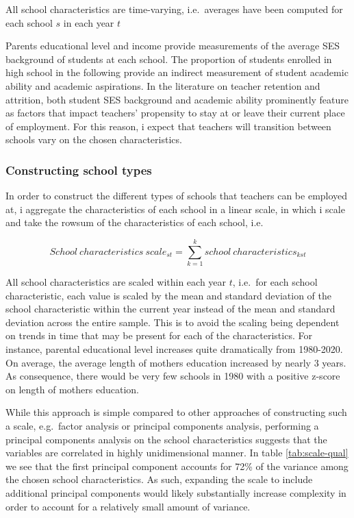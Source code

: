 \documentclass[
]{article}
\begin{document}
All school characteristics are time-varying, i.e.~averages have been computed for each school \(s\) in each year \(t\)

Parents educational level and income provide measurements of the average SES background of students at each school. The proportion of students enrolled in high school in the following provide an indirect measurement of student academic ability and academic aspirations. In the literature on teacher retention and attrition, both student SES background and academic ability prominently feature as factors that impact teachers' propensity to stay at or leave their current place of employment. For this reason, i expect that teachers will transition between schools vary on the chosen characteristics.

\hypertarget{constructing-school-types}{%
\subsubsection{Constructing school types}\label{constructing-school-types}}

In order to construct the different types of schools that teachers can be employed at, i aggregate the characteristics of each school in a linear scale, in which i scale and take the rowsum of the characteristics of each school, i.e.

\[School\ characteristics\ scale_{st}=\sum_{k=1}^{k}{school\ characteristics_{kst}}\]

All school characteristics are scaled within each year \(t\), i.e.~for each school characteristic, each value is scaled by the mean and standard deviation of the school characteristic within the current year instead of the mean and standard deviation across the entire sample. This is to avoid the scaling being dependent on trends in time that may be present for each of the characteristics. For instance, parental educational level increases quite dramatically from 1980-2020. On average, the average length of mothers education increased by nearly 3 years. As consequence, there would be very few schools in 1980 with a positive z-score on length of mothers education.

While this approach is simple compared to other approaches of constructing such a scale, e.g.~factor analysis or principal components analysis, performing a principal components analysis on the school characteristics suggests that the variables are correlated in highly unidimensional manner. In table \ref{tab:scale-qual} we see that the first principal component accounts for 72\% of the variance among the chosen school characteristics. As such, expanding the scale to include additional principal components would likely substantially increase complexity in order to account for a relatively small amount of variance.
\end{document}
